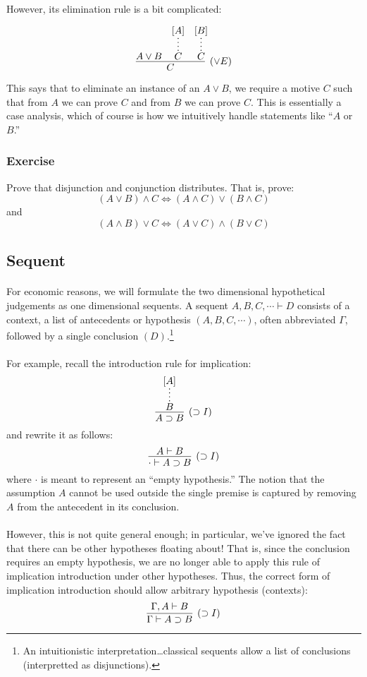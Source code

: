 \documentclass[a4paper]{article}
\begin{document}
However, its elimination rule is a bit complicated:

$$\infer[(\lor E)]{C}{A \lor B & \infer*{C}{[A]} & \infer*{C}{[B]}}$$

This says that to eliminate an instance of an $A \lor B$, we require a motive
$C$ such that from $A$ we can prove $C$ and from $B$ we can prove $C$. This is
essentially a case analysis, which of course is how we intuitively handle
statements like ``$A$ or $B$.''

\subsubsection{Exercise}
Prove that disjunction and conjunction distributes. That is, prove:
$$(A \lor B) \land C \Leftrightarrow (A \land C) \lor (B \land C)$$
and
$$(A \land B) \lor C \Leftrightarrow (A \lor C) \land (B \lor C)$$

\subsection{Sequent}
\paragraph{}
For economic reasons, we will formulate the two dimensional hypothetical
judgements as one dimensional sequents. A sequent $A,B,C,\cdots \vdash D$
consists of a context, a list of antecedents or hypothesis $(A,B,C,\cdots)$, often
abbreviated $\Gamma$, followed by a single conclusion $(D)$.\footnote{An
  intuitionistic interpretation\ldots classical sequents allow a list of
conclusions (interpretted as disjunctions).}

\paragraph{}
For example, recall the introduction rule for implication:
$$\infer[(\supset I)]{A \supset B}{\infer*{B}{[A]}}$$
and rewrite it as follows:
$$\infer[(\supset I)]{\cdot \vdash A \supset B}{A \vdash B}$$
where $\cdot$ is meant to represent an ``empty hypothesis.'' The notion that the
assumption $A$ cannot be used outside the single premise is captured by removing
$A$ from the antecedent in its conclusion.

\paragraph{}
However, this is not quite general enough; in particular, we've ignored the
fact that there can be other hypotheses floating about! That is, since the
conclusion requires an empty hypothesis, we are no longer able to apply this
rule of implication introduction under other hypotheses. Thus, the correct form
of implication introduction should allow arbitrary hypothesis (contexts):
$$\infer[(\supset I)]{\Gamma \vdash A \supset B}{\Gamma, A \vdash B}$$
\end{document}
